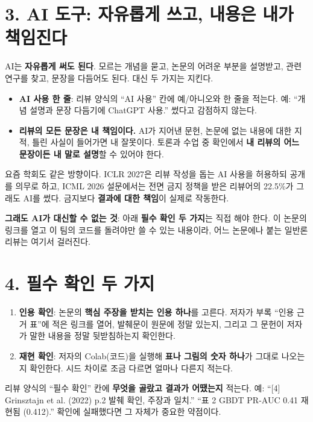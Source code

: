 \documentclass[11pt]{article}
\begin{document}
\section*{3. AI 도구: 자유롭게 쓰고, 내용은 내가 책임진다}
AI는 \textbf{자유롭게 써도 된다}. 모르는 개념을 묻고, 논문의 어려운 부분을 설명받고, 관련 연구를 찾고, 문장을 다듬어도 된다. 대신 두 가지는 지킨다.
\begin{itemize}
\item \textbf{AI 사용 한 줄}: 리뷰 양식의 ``AI 사용'' 칸에 예/아니오와 한 줄을 적는다. 예: ``개념 설명과 문장 다듬기에 ChatGPT 사용.'' 썼다고 감점하지 않는다.
\item \textbf{리뷰의 모든 문장은 내 책임이다.} AI가 지어낸 문헌, 논문에 없는 내용에 대한 지적, 틀린 사실이 들어가면 내 잘못이다. 토론과 수업 중 확인에서 \textbf{내 리뷰의 어느 문장이든 내 말로 설명}할 수 있어야 한다.
\end{itemize}

\noindent 요즘 학회도 같은 방향이다. ICLR 2027은 리뷰 작성을 돕는 AI 사용을 허용하되 공개를 의무로 하고, ICML 2026 설문에서는 전면 금지 정책을 받은 리뷰어의 22.5\%가 그래도 AI를 썼다. 금지보다 \textbf{결과에 대한 책임}이 실제로 작동한다.

\vspace{4pt}
\noindent\textbf{그래도 AI가 대신할 수 없는 것}: 아래 \textbf{필수 확인 두 가지}는 직접 해야 한다. 이 논문의 링크를 열고 이 팀의 코드를 돌려야만 쓸 수 있는 내용이라, 어느 논문에나 붙는 일반론 리뷰는 여기서 걸러진다.

\section*{4. 필수 확인 두 가지}
\begin{enumerate}
\item \textbf{인용 확인}: 논문의 \textbf{핵심 주장을 받치는 인용 하나}를 고른다. 저자가 부록 ``인용 근거 표''에 적은 링크를 열어, 발췌문이 원문에 정말 있는지, 그리고 그 문헌이 저자가 말한 내용을 정말 뒷받침하는지 확인한다.
\item \textbf{재현 확인}: 저자의 Colab(코드)을 실행해 \textbf{표나 그림의 숫자 하나}가 그대로 나오는지 확인한다. 시드 차이로 조금 다르면 얼마나 다른지 적는다.
\end{enumerate}
리뷰 양식의 ``필수 확인'' 칸에 \textbf{무엇을 골랐고 결과가 어땠는지} 적는다. 예: ``[4] Grinsztajn et al. (2022) p.2 발췌 확인, 주장과 일치.'' ``표 2 GBDT PR-AUC 0.41 재현됨 (0.412).'' 확인에 실패했다면 그 자체가 중요한 약점이다.
\end{document}
